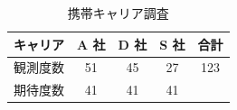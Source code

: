 \begin{table}[ht]
	\centering
	\caption{携帯キャリア調査}
	\begin{tabular}{c|ccc|c}
		キャリア & A 社 & D 社 & S 社 & 合計  \\\hline
		観測度数 & 51  & 45  & 27  & 123 \\
		期待度数 & 41  & 41  & 41  &     \\
	\end{tabular}
	\label{tbl:23_01}
\end{table}
